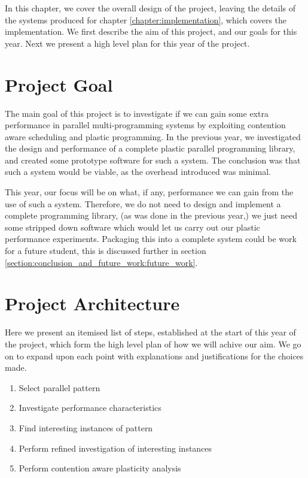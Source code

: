 
In this chapter, we cover the overall design of the project, leaving the details of the systems produced for chapter \ref{chapter:implementation}, which covers the implementation. We first describe the aim of this project, and our goals for this year. Next we present a high level plan for this year of the project.



\section{Project Goal}
\label{section:design:project_goal}

The main goal of this project is to investigate if we can gain some extra performance in parallel multi-programming systems by exploiting contention aware scheduling and plastic programming. In the previous year, we investigated the design and performance of a complete plastic parallel programming library, and created some prototype software for such a system. The conclusion was that such a system would be viable, as the overhead introduced was minimal. 

This year, our focus will be on what, if any, performance we can gain from the use of such a system. Therefore, we do not need to design and implement a complete programming library, (as was done in the previous year,) we just need some stripped down software which would let us carry out our plastic performance experiments. Packaging this into a complete system could be work for a future student, this is discussed further in section \ref{section:conclusion_and_future_work:future_work}.



\section{Project Architecture}
\label{section:design:project_archetecture}

Here we present an itemised list of steps, established at the start of this year of the project, which form the high level plan of how we will achive our aim. We go on to expand upon each point with explanations and justifications for the choices made.

\begin{enumerate}
    \item Select parallel pattern
    
    \item Investigate performance characteristics
    
    \item Find interesting instances of pattern
    
    \item Perform refined investigation of interesting instances
    
    \item Perform contention aware plasticity analysis
\end{enumerate}



